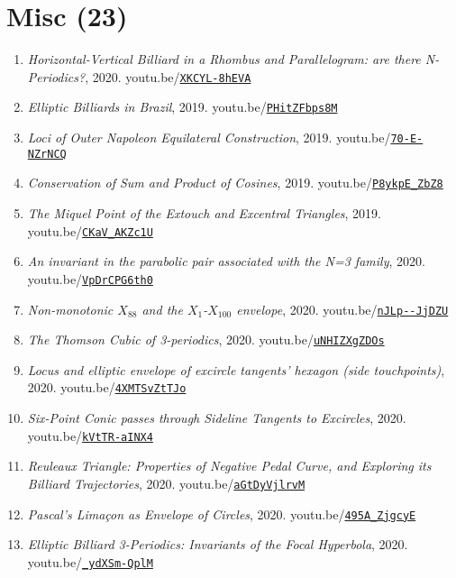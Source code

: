 \documentclass[12pt]{article}
\begin{document}
\section{Misc (23)}

\begin{enumerate}[resume]
\item \textit{Horizontal-Vertical Billiard in a Rhombus and Parallelogram: are there N-Periodics?}, 2020. youtu.be/\href{https://youtu.be/XKCYL-8hEVA}{\nolinkurl{XKCYL-8hEVA}}
\item \textit{Elliptic Billiards in Brazil}, 2019. youtu.be/\href{https://youtu.be/PHitZFbps8M}{\nolinkurl{PHitZFbps8M}}
\item \textit{Loci of Outer Napoleon Equilateral Construction}, 2019. youtu.be/\href{https://youtu.be/70-E-NZrNCQ}{\nolinkurl{70-E-NZrNCQ}}
\item \textit{Conservation of Sum and Product of Cosines}, 2019. youtu.be/\href{https://youtu.be/P8ykpE_ZbZ8}{\nolinkurl{P8ykpE\_ZbZ8}}
\item \textit{The Miquel Point of the Extouch and Excentral Triangles}, 2019. youtu.be/\href{https://youtu.be/CKaV_AKZc1U}{\nolinkurl{CKaV\_AKZc1U}}
\item \textit{An invariant in the parabolic pair associated with the N=3 family}, 2020. youtu.be/\href{https://youtu.be/VpDrCPG6th0}{\nolinkurl{VpDrCPG6th0}}
\item \textit{Non-monotonic $X_{88}$ and the $X_{1}$-$X_{100}$ envelope}, 2020. youtu.be/\href{https://youtu.be/nJLp--JjDZU}{\nolinkurl{nJLp--JjDZU}}
\item \textit{The Thomson Cubic of 3-periodics}, 2020. youtu.be/\href{https://youtu.be/uNHIZXgZDOs}{\nolinkurl{uNHIZXgZDOs}}
\item \textit{Locus and elliptic envelope of excircle tangents' hexagon (side touchpoints)}, 2020. youtu.be/\href{https://youtu.be/4XMTSvZtTJo}{\nolinkurl{4XMTSvZtTJo}}
\item \textit{Six-Point Conic passes through Sideline Tangents to Excircles}, 2020. youtu.be/\href{https://youtu.be/kVtTR-aINX4}{\nolinkurl{kVtTR-aINX4}}
\item \textit{Reuleaux Triangle: Properties of Negative Pedal Curve, and Exploring its Billiard Trajectories}, 2020. youtu.be/\href{https://youtu.be/aGtDyVjlrvM}{\nolinkurl{aGtDyVjlrvM}}
\item \textit{Pascal's Limaçon as Envelope of Circles}, 2020. youtu.be/\href{https://youtu.be/495A_ZjgcyE}{\nolinkurl{495A\_ZjgcyE}}
\item \textit{Elliptic Billiard 3-Periodics: Invariants of the Focal Hyperbola}, 2020. youtu.be/\href{https://youtu.be/_ydXSm-QplM}{\nolinkurl{\_ydXSm-QplM}}

\end{enumerate}
\end{document}
